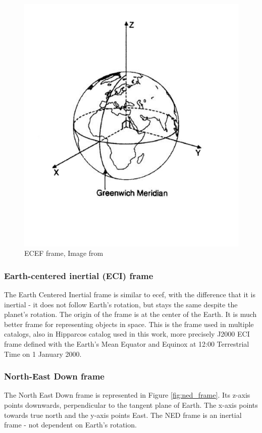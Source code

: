 \documentclass[12pt,a4paper,twoside]{article}
\begin{document}
\begin{figure}[!htb]
\includegraphics[scale=0.4]{eci_frame.jpg}
\centering
\caption[ECEF frame]{ECEF frame, Image from \citet{larson1992space}}
\label{fig:ecef_frame}
\end{figure}

\subsubsection{Earth-centered inertial (ECI) frame}
The Earth Centered Inertial frame is similar to \gls{ecef}, with the difference that it is inertial - it does not follow Earth's rotation, but stays the same despite the planet's rotation. The origin of the frame is at the center of the Earth. It is much better frame for representing objects in space\cite{larson1992space}. This is the frame used in multiple catalogs, also in Hipparcos catalog used in this work, more precisely J2000 ECI frame defined with the Earth's Mean Equator and Equinox at 12:00 Terrestrial Time on 1 January 2000.

\subsubsection{North-East Down frame}
The North East Down frame is represented in Figure \ref{fig:ned_frame}. Its z-axis points downwards, perpendicular to the tangent plane of Earth. The x-axis points towards true north and the y-axis points East. The NED frame is an inertial frame - not dependent on Earth's rotation.
\end{document}
